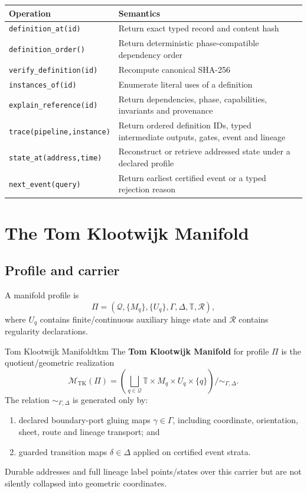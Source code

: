\documentclass[10pt,a4paper]{article}
\newcommand{\TKM}{\mathcal{M}_{\mathrm{TK}}}
\newcommand{\Time}{\mathbb{T}}
\newcommand{\code}[1]{\texttt{#1}}
\begin{document}
\begin{center}
\begin{tabularx}{0.96\textwidth}{@{}L{52mm}Y@{}}
\toprule
\textbf{Operation} & \textbf{Semantics} \\
\midrule
\code{definition\_at(id)} & Return exact typed record and content hash \\
\code{definition\_order()} & Return deterministic phase-compatible dependency order \\
\code{verify\_definition(id)} & Recompute canonical SHA-256 \\
\code{instances\_of(id)} & Enumerate literal uses of a definition \\
\code{explain\_reference(id)} & Return dependencies, phase, capabilities, invariants and provenance \\
\code{trace(pipeline,instance)} & Return ordered definition IDs, typed intermediate outputs, gates, event and lineage \\
\code{state\_at(address,time)} & Reconstruct or retrieve addressed state under a declared profile \\
\code{next\_event(query)} & Return earliest certified event or a typed rejection reason \\
\bottomrule
\end{tabularx}
\end{center}

\section{The Tom Klootwijk Manifold}
\label{sec:manifold}

\subsection{Profile and carrier}

A manifold profile is
\[
\Pi=(\mathcal Q,\{M_q\},\{U_q\},\Gamma,\Delta,\Time,\mathcal R),
\]
where \(U_q\) contains finite/continuous auxiliary hinge state and \(\mathcal R\) contains regularity declarations.

\begin{formaldef}{Tom Klootwijk Manifold}{tkm}
The \textbf{Tom Klootwijk Manifold} for profile \(\Pi\) is the quotient/geometric realization
\[
\TKM(\Pi)=
\left(
\bigsqcup_{q\in\mathcal Q}
\Time\times M_q\times U_q\times\{q\}
\right)\Big/\sim_{\Gamma,\Delta}.
\]
The relation \(\sim_{\Gamma,\Delta}\) is generated only by:
\begin{enumerate}
  \item declared boundary-port gluing maps \(\gamma\in\Gamma\), including coordinate, orientation, sheet, route and lineage transport; and
  \item guarded transition maps \(\delta\in\Delta\) applied on certified event strata.
\end{enumerate}
Durable addresses and full lineage label points/states over this carrier but are not silently collapsed into geometric coordinates.
\end{formaldef}
\end{document}
